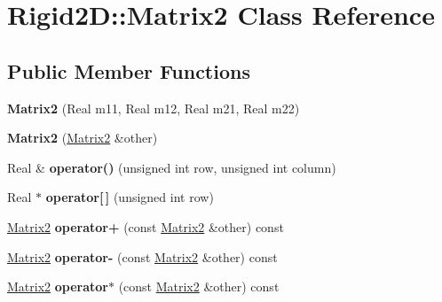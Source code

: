 \hypertarget{class_rigid2_d_1_1_matrix2}{
\section{Rigid2D::Matrix2 Class Reference}
\label{class_rigid2_d_1_1_matrix2}
}
\subsection*{Public Member Functions}
\begin{DoxyCompactItemize}
\item 
\hypertarget{class_rigid2_d_1_1_matrix2_ad26640d4ebdecba7ae1c251f23c54d43}{
{\bfseries Matrix2} (Real m11, Real m12, Real m21, Real m22)}
\label{class_rigid2_d_1_1_matrix2_ad26640d4ebdecba7ae1c251f23c54d43}

\item 
\hypertarget{class_rigid2_d_1_1_matrix2_ad955870fc6c3f4322ead09818a5753a6}{
{\bfseries Matrix2} (\hyperlink{class_rigid2_d_1_1_matrix2}{Matrix2} \&other)}
\label{class_rigid2_d_1_1_matrix2_ad955870fc6c3f4322ead09818a5753a6}

\item 
\hypertarget{class_rigid2_d_1_1_matrix2_a1307811da4a2d118e5db932ccb69c2f6}{
Real \& {\bfseries operator()} (unsigned int row, unsigned int column)}
\label{class_rigid2_d_1_1_matrix2_a1307811da4a2d118e5db932ccb69c2f6}

\item 
\hypertarget{class_rigid2_d_1_1_matrix2_acf6a6e49395b4c678c85db41cb1e9801}{
Real $\ast$ {\bfseries operator\mbox{[}$\,$\mbox{]}} (unsigned int row)}
\label{class_rigid2_d_1_1_matrix2_acf6a6e49395b4c678c85db41cb1e9801}

\item 
\hypertarget{class_rigid2_d_1_1_matrix2_afb242c2645e15d9d31800f42e9a64092}{
\hyperlink{class_rigid2_d_1_1_matrix2}{Matrix2} {\bfseries operator+} (const \hyperlink{class_rigid2_d_1_1_matrix2}{Matrix2} \&other) const }
\label{class_rigid2_d_1_1_matrix2_afb242c2645e15d9d31800f42e9a64092}

\item 
\hypertarget{class_rigid2_d_1_1_matrix2_a06b4e2ba98732d5def12e75c29fb1ed5}{
\hyperlink{class_rigid2_d_1_1_matrix2}{Matrix2} {\bfseries operator-\/} (const \hyperlink{class_rigid2_d_1_1_matrix2}{Matrix2} \&other) const }
\label{class_rigid2_d_1_1_matrix2_a06b4e2ba98732d5def12e75c29fb1ed5}

\item 
\hypertarget{class_rigid2_d_1_1_matrix2_a460d806375f341f21616b9c497193f46}{
\hyperlink{class_rigid2_d_1_1_matrix2}{Matrix2} {\bfseries operator$\ast$} (const \hyperlink{class_rigid2_d_1_1_matrix2}{Matrix2} \&other) const }
\label{class_rigid2_d_1_1_matrix2_a460d806375f341f21616b9c497193f46}


\end{DoxyCompactItemize}
